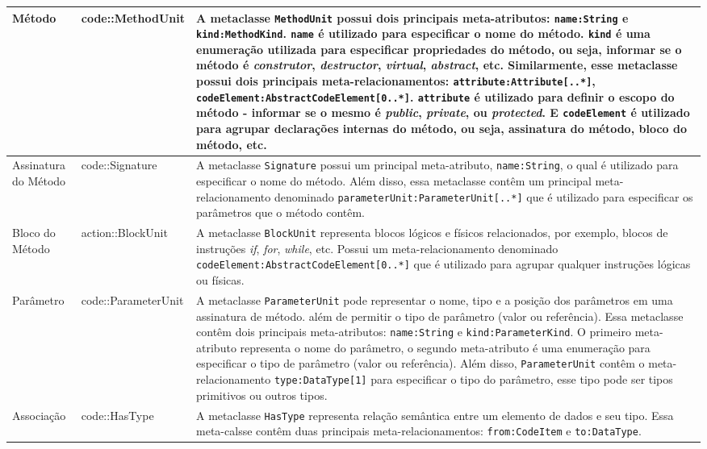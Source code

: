 \begin{center}
\begin{longtable}{ | m{1.9cm} | m{3.57cm}| m{9.3cm} | }
\hline
Método & code::MethodUnit & A metaclasse \texttt{MethodUnit} possui dois principais meta-atributos: \texttt{name:String} e \texttt{kind:MethodKind}. \texttt{name} é utilizado para especificar o nome do método. \texttt{kind} é uma enumeração utilizada para especificar propriedades do método, ou seja, informar se o método é \textit{construtor}, \textit{destructor}, \textit{virtual}, \textit{abstract}, etc. Similarmente, esse metaclasse possui dois principais meta-relacionamentos: \texttt{attribute:Attribute[..*]}, \texttt{codeElement:AbstractCodeElement[0..*]}. \texttt{attribute} é utilizado para definir o escopo do método - informar se o mesmo é \textit{public}, \textit{private}, ou \textit{protected}. E \texttt{codeElement} é utilizado para agrupar declarações internas do método, ou seja, assinatura do método, bloco do método, etc.\\ 
\hline
Assinatura do Método & code::Signature & A metaclasse \texttt{Signature} possui um principal meta-atributo, \texttt{name:String}, o qual é utilizado para especificar o nome do método. Além disso, essa metaclasse contêm um principal meta-relacionamento denominado \texttt{parameterUnit:ParameterUnit[..*]} que é utilizado para especificar os parâmetros que o método contêm.\\ 
\hline
Bloco do Método & action::BlockUnit & A metaclasse \texttt{BlockUnit} representa blocos lógicos e físicos relacionados, por exemplo, blocos de instruções \textit{if}, \textit{for}, \textit{while}, etc. Possui um meta-relacionamento denominado \texttt{codeElement:AbstractCodeElement[0..*]} que é utilizado para agrupar qualquer instruções lógicas ou físicas.\\ 
\hline
Parâmetro & code::ParameterUnit & A metaclasse \texttt{ParameterUnit} pode representar o nome, tipo e a posição dos parâmetros em uma assinatura de método. além de permitir o tipo de parâmetro (valor ou referência). Essa metaclasse contêm dois principais meta-atributos: \texttt{name:String} e \texttt{kind:ParameterKind}. O primeiro meta-atributo representa o nome do parâmetro, o segundo meta-atributo é uma enumeração para especificar o tipo de parâmetro (valor ou referência). Além disso, \texttt{ParameterUnit} contêm o meta-relacionamento \texttt{type:DataType[1]} para especificar o tipo do parâmetro, esse tipo pode ser tipos primitivos ou outros tipos.\\ 
\hline
Associação & code::HasType & A metaclasse \texttt{HasType} representa relação semântica entre um elemento de dados e seu tipo. Essa meta-calsse contêm duas principais meta-relacionamentos: \texttt{from:CodeItem} e \texttt{to:DataType}.\\ 

\end{longtable}
\end{center}
